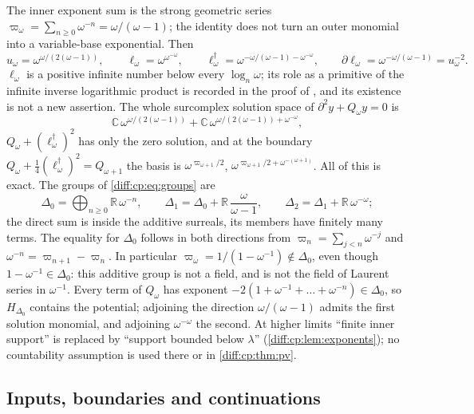\documentclass[11pt,letterpaper]{article}
\numberwithin{equation}{section}
\theoremstyle{definition}
\theoremstyle{remark}
\newcommand{\R}{\mathbb R}
\newcommand{\C}{\mathbb C}
\newcommand{\der}{\partial}
\begin{document}
\begin{example}[$\lambda=\omega$]
\label{diff:cp:ex:omega}
The inner exponent sum is the strong geometric series
$\varpi_{\omega}=\sum_{n\geq0}\omega^{-n}=\omega/(\omega-1)$; the identity does
not turn an outer monomial into a variable-base exponential. Then
\[
 u_{\omega}=\omega^{\omega/(2(\omega-1))},\qquad
 \ell_{\omega}=\omega^{\omega^{-\omega}},\qquad
 \ell_{\omega}^{\dagger}=\omega^{-\omega/(\omega-1)-\omega^{-\omega}},\qquad
 \der\ell_{\omega}=\omega^{-\omega/(\omega-1)}=u_{\omega}^{-2}.
\]
$\ell_{\omega}$ is a positive infinite number below every $\log_{n}\omega$; its
role as a primitive of the infinite inverse logarithmic product is recorded in
the proof of \cite[Theorem~8.4]{BMGerms}, and its existence is not a new
assertion. The whole surcomplex solution space of $\der^{2}y+Q_{\omega}y=0$ is
\[
 \C\,\omega^{\omega/(2(\omega-1))}+\C\,\omega^{\omega/(2(\omega-1))+\omega^{-\omega}},
\]
$Q_{\omega}+(\ell_{\omega}^{\dagger})^{2}$ has only the zero solution, and at
the boundary $Q_{\omega}+\frac14(\ell_{\omega}^{\dagger})^{2}=Q_{\omega+1}$ the
basis is $\omega^{\varpi_{\omega+1}/2}$,
$\omega^{\varpi_{\omega+1}/2+\omega^{-(\omega+1)}}$. All of this is exact. The
groups of \cref{diff:cp:eq:groups} are
\[
 \Delta_{0}=\bigoplus_{n\geq0}\R\,\omega^{-n},\qquad
 \Delta_{1}=\Delta_{0}+\R\,\frac{\omega}{\omega-1},\qquad
 \Delta_{2}=\Delta_{1}+\R\,\omega^{-\omega};
\]
the direct sum is inside the additive surreals, its members have finitely
many terms. The equality for $\Delta_0$ follows in both directions
from $\varpi_n=\sum_{j<n}\omega^{-j}$ and
$\omega^{-n}=\varpi_{n+1}-\varpi_n$. In particular
$\varpi_\omega=1/(1-\omega^{-1})\notin\Delta_0$, even though
$1-\omega^{-1}\in\Delta_0$: this additive group is not a field,
and is not the field of Laurent series in $\omega^{-1}$. Every
term of $Q_{\omega}$ has exponent $-2(1+\omega^{-1}+\dots+\omega^{-n})\in\Delta_{0}$,
so $H_{\Delta_{0}}$ contains the potential; adjoining the direction
$\omega/(\omega-1)$ admits the first solution monomial, and adjoining
$\omega^{-\omega}$ the second. At higher limits ``finite inner support'' is
replaced by ``support bounded below $\lambda$'' (\cref{diff:cp:lem:exponents});
no countability assumption is used there or in \cref{diff:cp:thm:pv}.
\end{example}

\subsection{Inputs, boundaries and continuations}
\label{diff:cp:sub:limits}
\end{document}
